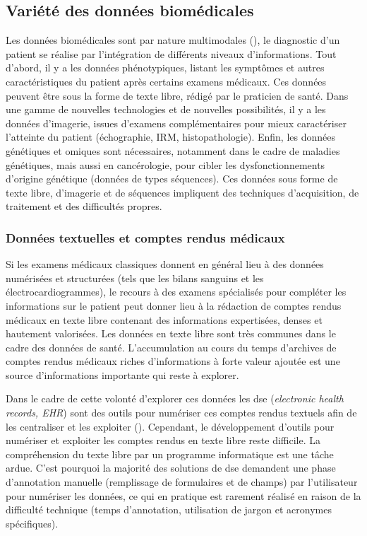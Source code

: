 \subsection{Variété des données biomédicales}
Les données biomédicales sont par nature multimodales (\cite{acosta_multimodal_2022}), le diagnostic d'un patient se réalise par l'intégration de différents niveaux d'informations. Tout d'abord, il y a les données phénotypiques, listant les symptômes et autres caractéristiques du patient après certains examens médicaux. Ces données peuvent être sous la forme de texte libre, rédigé par le praticien de santé. Dans une gamme de nouvelles technologies et de nouvelles possibilités, il y a les données d'imagerie, issues d'examens complémentaires pour mieux caractériser l'atteinte du patient (échographie, IRM, histopathologie). Enfin, les données génétiques et omiques sont nécessaires, notamment dans le cadre de maladies génétiques, mais aussi en cancérologie, pour cibler les dysfonctionnements d'origine génétique (données de types séquences). Ces données sous forme de texte libre, d'imagerie et de séquences impliquent des techniques d'acquisition, de traitement et des difficultés propres.

\subsubsection{Données textuelles et comptes rendus médicaux}
Si les examens médicaux classiques donnent en général lieu à des données numérisées et structurées (tels que les bilans sanguins et les électrocardiogrammes), le recours à des examens spécialisés pour compléter les informations sur le patient peut donner lieu à la rédaction de comptes rendus médicaux en texte libre contenant des informations expertisées, denses et hautement valorisées. Les données en texte libre sont très communes dans le cadre des données de santé. L'accumulation au cours du temps d'archives de comptes rendus médicaux riches d'informations à forte valeur ajoutée est une source d'informations importante qui reste à explorer.

Dans le cadre de cette volonté d'explorer ces données les \gls{dse} (\textit{electronic health records, EHR}) sont des outils pour numériser ces comptes rendus textuels afin de les centraliser et les exploiter (\cite{graber_impact_2017}). Cependant, le développement d'outils pour numériser et exploiter les comptes rendus en texte libre reste difficile. La compréhension du texte libre par un programme informatique est une tâche ardue. C'est pourquoi la majorité des solutions de \gls{dse} demandent une phase d'annotation manuelle (remplissage de formulaires et de champs) par l'utilisateur pour numériser les données, ce qui en pratique est rarement réalisé en raison de la difficulté technique (temps d'annotation, utilisation de jargon et acronymes spécifiques).

